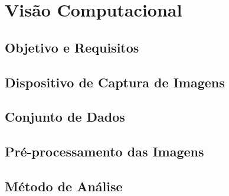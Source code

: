 
\chapter{Visão Computacional}
\label{chap:visao-computacional}


\section{Objetivo e Requisitos}
\label{sec:objetivo-visao-computacional}


\section{Dispositivo de Captura de Imagens}
\label{sec:captura-imagens}


\section{Conjunto de Dados}
\label{sec:conjunto-dados-visao}


\section{Pré-processamento das Imagens}
\label{sec:preprocessamento-imagens}


\section{Método de Análise}
\label{sec:metodo-analise-imagens}

